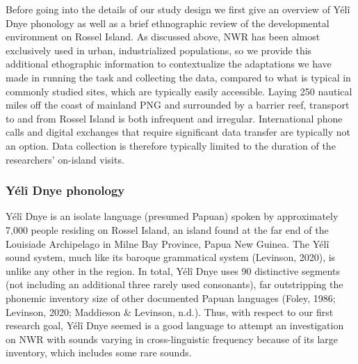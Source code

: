 \documentclass[english,,man,floatsintext]{apa6}
\begin{document}
Before going into the details of our study design we first give an overview of Yélî Dnye phonology as well as a brief ethnographic review of the developmental environment on Rossel Island. As discussed above, NWR has been almost exclusively used in urban, industrialized populations, so we provide this additional ethographic information to contextualize the adaptations we have made in running the task and collecting the data, compared to what is typical in commonly studied sites, which are typically easily accessible. Laying 250 nautical miles off the coast of mainland PNG and surrounded by a barrier reef, transport to and from Rossel Island is both infrequent and irregular. International phone calls and digital exchanges that require significant data transfer are typically not an option. Data collection is therefore typically limited to the duration of the researchers' on-island visits.

\hypertarget{yuxe9luxee-dnye-phonology}{%
\subsubsection{Yélî Dnye phonology}\label{yuxe9luxee-dnye-phonology}}

Yélî Dnye is an isolate language (presumed Papuan) spoken by approximately 7,000 people residing on Rossel Island, an island found at the far end of the Louisiade Archipelago in Milne Bay Province, Papua New Guinea. The Yélî sound system, much like its baroque grammatical system (Levinson, 2020), is unlike any other in the region. In total, Yélî Dnye uses 90 distinctive segments (not including an additional three rarely used consonants), far outstripping the phonemic inventory size of other documented Papuan languages (Foley, 1986; Levinson, 2020; Maddieson \& Levinson, n.d.). Thus, with respect to our first research goal, Yélî Dnye seemed is a good language to attempt an investigation on NWR with sounds varying in cross-linguistic frequency because of its large inventory, which includes some rare sounds.
\end{document}
